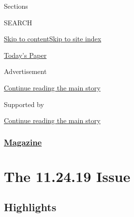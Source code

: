 Sections

SEARCH

\protect\hyperlink{site-content}{Skip to
content}\protect\hyperlink{site-index}{Skip to site index}

\href{https://myaccount.nytimes3xbfgragh.onion/auth/login?response_type=cookie\&client_id=vi}{}

\href{https://www.nytimes3xbfgragh.onion/section/todayspaper}{Today's
Paper}

Advertisement

\protect\hyperlink{after-top}{Continue reading the main story}

Supported by

\protect\hyperlink{after-sponsor}{Continue reading the main story}

\hypertarget{magazine}{%
\subsubsection{\texorpdfstring{\href{/section/magazine}{Magazine}}{Magazine}}\label{magazine}}

\hypertarget{the-112419-issue}{%
\section{The 11.24.19 Issue}\label{the-112419-issue}}

\hypertarget{highlights}{%
\subsection{Highlights}\label{highlights}}

